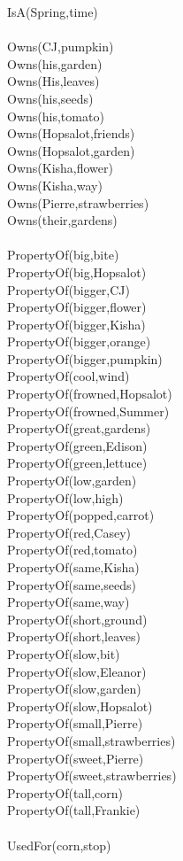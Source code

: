 \begin{multicols}{2}
\begin{footnotesize}
IsA(Spring,time) \\
~\\
Owns(CJ,pumpkin) \\
Owns(his,garden) \\
Owns(His,leaves) \\
Owns(his,seeds) \\
Owns(his,tomato) \\
Owns(Hopsalot,friends) \\
Owns(Hopsalot,garden) \\
Owns(Kisha,flower) \\
Owns(Kisha,way) \\
Owns(Pierre,strawberries) \\
Owns(their,gardens) \\
~\\
PropertyOf(big,bite) \\
PropertyOf(big,Hopsalot) \\
PropertyOf(bigger,CJ) \\
PropertyOf(bigger,flower) \\
PropertyOf(bigger,Kisha) \\
PropertyOf(bigger,orange) \\
PropertyOf(bigger,pumpkin) \\
PropertyOf(cool,wind) \\
PropertyOf(frowned,Hopsalot) \\
PropertyOf(frowned,Summer) \\
PropertyOf(great,gardens) \\
PropertyOf(green,Edison) \\
PropertyOf(green,lettuce) \\
PropertyOf(low,garden) \\
PropertyOf(low,high) \\
PropertyOf(popped,carrot) \\
PropertyOf(red,Casey) \\
PropertyOf(red,tomato) \\
PropertyOf(same,Kisha) \\
PropertyOf(same,seeds) \\
PropertyOf(same,way) \\
PropertyOf(short,ground) \\
PropertyOf(short,leaves) \\
PropertyOf(slow,bit) \\
PropertyOf(slow,Eleanor) \\
PropertyOf(slow,garden) \\
PropertyOf(slow,Hopsalot) \\
PropertyOf(small,Pierre) \\
PropertyOf(small,strawberries) \\
PropertyOf(sweet,Pierre) \\
PropertyOf(sweet,strawberries) \\
PropertyOf(tall,corn) \\
PropertyOf(tall,Frankie) \\
~\\
UsedFor(corn,stop) \\
\end{footnotesize}
\end{multicols}


